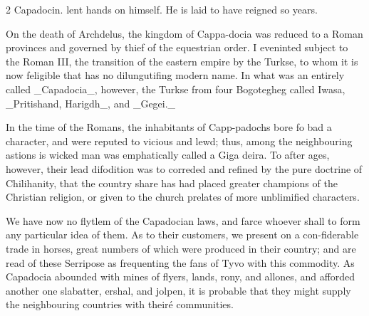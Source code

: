 \documentclass[10pt]{article}
\begin{document}
\begin{multicols}{2}\raggedcolumns
Capadocin. lent hands on himself. He is laid to have reigned so years.

On the death of Archdelus, the kingdom of Cappa-docia was reduced to a Roman provinces and governed by thief of the equestrian order. I eveninted subject to the Roman III, the transition of the eastern empire by the Turkse, to whom it is now feligible that has no dilungutifing modern name. In what was an entirely called \_Capadocia\_, however, the Turkse from four Bogotegheg called Iwasa, \_Pritishand, Harigdh\_, and \_Gegei.\_

In the time of the Romans, the inhabitants of Capp-padochs bore fo bad a character, and were reputed to vicious and lewd; thus, among the neighbouring astions is wicked man was emphatically called a Giga deira. To after ages, however, their lead difodition was to correded and refined by the pure doctrine of Chilihanity, that the country share has had placed greater champions of the Christian religion, or given to the church prelates of more unblimified characters.

We have now no flytlem of the Capadocian laws, and farce whoever shall to form any particular idea of them. As to their customers, we present on a con-fiderable trade in horses, great numbers of which were produced in their country; and are read of these Serripose as frequenting the fans of Tyvo with this commodity. As Capadocia abounded with mines of flyers, lands, rony, and allones, and afforded another one slabatter, ershal, and jolpen, it is probable that they might supply the neighbouring countries with theiré communities.


\end{multicols}
\end{document}
